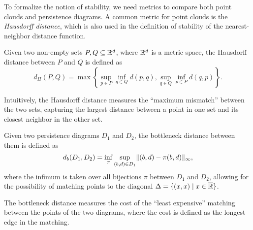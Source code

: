 To formalize the notion of stability, we need metrics to compare both point
clouds and persistence diagrams. A common metric for point clouds is the
\emph{Hausdorff distance}, which is also used in the definition of stability of
the nearest-neighbor distance function.
\begin{definition}
    Given two non-empty sets $P, Q \subseteq \mathbb{R}^d$, where $\mathbb{R}^d$ is a metric
    space, the Hausdorff distance between $P$ and $Q$ is defined as
    \begin{equation}
        d_H(P, Q) = \max\left\{ \sup_{p \in P} \inf_{q \in Q} d(p, q), \sup_{q \in Q} \inf_{p \in P} d(q, p) \right\}.
    \end{equation}
\end{definition}
Intuitively, the Hausdorff distance measures the ``maximum mismatch'' between the two
sets, capturing the largest distance between a point in one set and its closest
neighbor in the other set.

\begin{definition}
    Given two persistence diagrams $D_1$ and $D_2$, the bottleneck distance
    between them is defined as
    \begin{equation}
        d_b(D_1, D_2) = \inf_\pi \sup_{(b, d) \in D_1} \lVert(b, d) - \pi(b, d)\rVert_\infty,
    \end{equation}
    where the infimum is taken over all bijections $\pi$ between $D_1$ and
    $D_2$, allowing for the possibility of matching points to the diagonal $\Delta = \{(x, x) \mid x \in \overline{\mathbb{R}}\}$.
\end{definition}
The bottleneck distance measures the cost of the ``least expensive'' matching
between the points of the two diagrams, where the cost is defined as the longest
edge in the matching.


